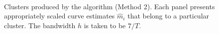 \documentclass[a4paper,12pt]{article}
\numberwithin{equation}{section}
\begin{document}
\begin{figure}
\\
\hspace{0.25cm}
\caption{Clusters produced by the algorithm (Method 2). Each panel presents appropriately scaled curve estimates $\hat{m}_i$ that belong to a particular cluster. The bandwidth $h$ is taken to be $7/T$.}\label{fig:clusters_alt_14days}
\end{figure}

\clearpage

{\small
\setlength{\bibsep}{0.35em}
}
\end{document}

